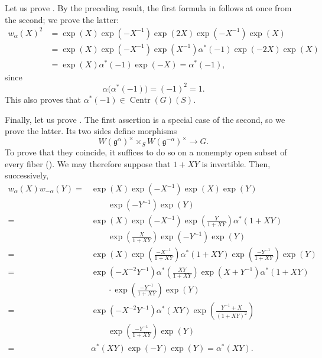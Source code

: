 Let us prove \textup{}. By the preceding result, the first
formula in \textup{} follows at once from the second; we prove
the latter:
\[
\begin{aligned}
  w_\alpha(X)^2
    &={}\exp(X)\exp(-X^{-1})\exp(2X)\exp(-X^{-1})\exp(X)\\
    &={}\exp(X)\exp(-X^{-1})\exp(X^{-1})
       \alpha^\ast(-1)\exp(-2X)\exp(X)\\
    &={}\exp(X)\alpha^\ast(-1)\exp(-X)
       =\alpha^\ast(-1),
\end{aligned}
\]
since
\[
  \alpha\bigl(\alpha^\ast(-1)\bigr)=(-1)^2=1.
\]
This also proves that
\(\alpha^\ast(-1)\in\operatorname{Centr}(G)(S)\).

Finally, let us prove \textup{}. The first assertion is a
special case of the second, so we prove the latter. Its two sides
define morphisms
\[
  W(\mathfrak g^\alpha)^\times
    \times_S W(\mathfrak g^{-\alpha})^\times
  \longrightarrow G.
\]
To prove that they coincide, it suffices to do so on a nonempty
open subset of every fiber \textup{()}. We may
therefore suppose that \(1+XY\) is invertible. Then, successively,
\[
\begin{aligned}
  w_\alpha(X)w_{-\alpha}(Y)
    ={}&\exp(X)\exp(-X^{-1})\exp(X)
        \exp(Y)\\
       &\qquad{}\exp(-Y^{-1})\exp(Y)\\
    ={}&\exp(X)\exp(-X^{-1})
        \exp\left(\frac{Y}{1+XY}\right)
        \alpha^\ast(1+XY)\\
       &\qquad{}
        \exp\left(\frac{X}{1+XY}\right)
        \exp(-Y^{-1})\exp(Y)\\
    ={}&\exp(X)
        \exp\left(\frac{-X^{-1}}{1+XY}\right)
        \alpha^\ast(1+XY)
        \exp\left(\frac{-Y^{-1}}{1+XY}\right)\exp(Y)\\
    ={}&\exp(-X^{-2}Y^{-1})
        \alpha^\ast\left(\frac{XY}{1+XY}\right)
        \exp(X+Y^{-1})\alpha^\ast(1+XY)\\
       &{}\qquad\cdot
        \exp\left(\frac{-Y^{-1}}{1+XY}\right)\exp(Y)\\
    ={}&\exp(-X^{-2}Y^{-1})\alpha^\ast(XY)
        \exp\left(\frac{Y^{-1}+X}{(1+XY)^2}\right)\\
       &\qquad{}
        \exp\left(\frac{-Y^{-1}}{1+XY}\right)\exp(Y)\\
    ={}&\alpha^\ast(XY)\exp(-Y)\exp(Y)
        =\alpha^\ast(XY).
\end{aligned}
\]

